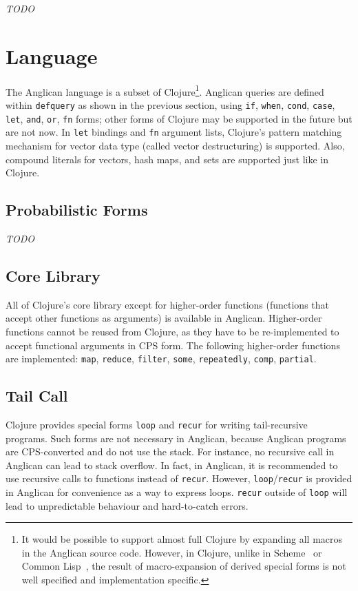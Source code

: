 \documentclass[preprint]{sigplanconf}
\begin{document}
{\it TODO}

\section{Language}
\label{sec:language}

The Anglican language is a subset of Clojure\footnote{It would be
possible to support almost full Clojure by expanding all macros
in the Anglican source code. However, in Clojure, unlike in
Scheme~\cite{SDF+10} or Common Lisp~\cite{PC94}, the result
of macro-expansion of derived special forms is not well
specified and implementation specific.}.  Anglican queries
are defined within \texttt{defquery} as shown in the previous section,
using \texttt{if}, \texttt{when}, \texttt{cond}, \texttt{case},
\texttt{let}, \texttt{and}, \texttt{or}, \texttt{fn} forms;
other forms of Clojure may be supported in the future but are not now.
In \texttt{let} bindings and \texttt{fn} argument lists,
Clojure's pattern matching mechanism for vector data type
(called vector destructuring) is supported. Also, compound
literals for vectors, hash maps, and
sets are supported just like in Clojure.

\subsection{Probabilistic Forms}

{\it TODO}

\subsection{Core Library}
\label{sec:core}

All of Clojure's core library except for higher-order functions
(functions that accept other functions as arguments) is
available in Anglican. Higher-order functions cannot be reused
from Clojure, as they have to be re-implemented to accept
functional arguments in CPS form. The following higher-order
functions are implemented: \texttt{map}, \texttt{reduce},
\texttt{filter}, \texttt{some}, \texttt{repeatedly},
\texttt{comp}, \texttt{partial}.

\subsection{Tail Call}
\label{sec:tail}

Clojure provides special forms \texttt{loop} and \texttt{recur}
for writing tail-recursive programs. Such forms are not necessary
in Anglican, because Anglican programs are CPS-converted and do
not use the stack. For instance, no recursive call in Anglican
can lead to stack overflow.  In fact, in Anglican, it is
recommended to use recursive calls to functions instead of
\texttt{recur}. However, \texttt{loop}/\texttt{recur} is
provided in Anglican for convenience as a way to express loops.
\texttt{recur} outside of \texttt{loop} will lead to
unpredictable behaviour and hard-to-catch errors.
\end{document}
